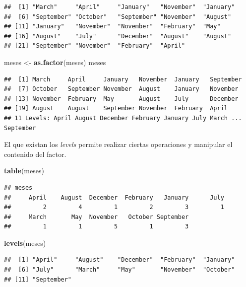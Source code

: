\documentclass[
]{book}
\newenvironment{Shaded}{\begin{snugshade}}{\end{snugshade}}
\newcommand{\FunctionTok}[1]{\textcolor[rgb]{0.13,0.29,0.53}{\textbf{#1}}}
\newcommand{\NormalTok}[1]{#1}
\newcommand{\OtherTok}[1]{\textcolor[rgb]{0.56,0.35,0.01}{#1}}
\begin{document}
\begin{verbatim}
##  [1] "March"     "April"     "January"   "November"  "January"  
##  [6] "September" "October"   "September" "November"  "August"   
## [11] "January"   "November"  "November"  "February"  "May"      
## [16] "August"    "July"      "December"  "August"    "August"   
## [21] "September" "November"  "February"  "April"
\end{verbatim}

\begin{Shaded}
\begin{Highlighting}[]
\NormalTok{meses }\OtherTok{\textless{}{-}} \FunctionTok{as.factor}\NormalTok{(meses)}
\NormalTok{meses}
\end{Highlighting}
\end{Shaded}

\begin{verbatim}
##  [1] March     April     January   November  January   September
##  [7] October   September November  August    January   November 
## [13] November  February  May       August    July      December 
## [19] August    August    September November  February  April    
## 11 Levels: April August December February January July March ... September
\end{verbatim}

El que existan los \emph{levels} permite realizar ciertas operaciones y manipular el contenido del factor.

\begin{Shaded}
\begin{Highlighting}[]
\FunctionTok{table}\NormalTok{(meses)}
\end{Highlighting}
\end{Shaded}

\begin{verbatim}
## meses
##     April    August  December  February   January      July 
##         2         4         1         2         3         1 
##     March       May  November   October September 
##         1         1         5         1         3
\end{verbatim}

\begin{Shaded}
\begin{Highlighting}[]
\FunctionTok{levels}\NormalTok{(meses)}
\end{Highlighting}
\end{Shaded}

\begin{verbatim}
##  [1] "April"     "August"    "December"  "February"  "January"  
##  [6] "July"      "March"     "May"       "November"  "October"  
## [11] "September"
\end{verbatim}
\end{document}
